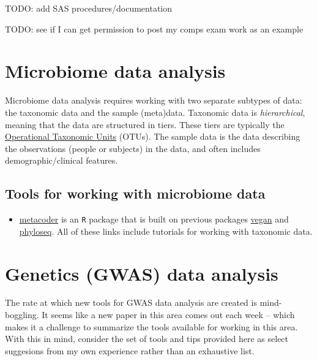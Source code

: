 \documentclass[
]{book}
\providecommand{\tightlist}{%
  \setlength{\itemsep}{0pt}\setlength{\parskip}{0pt}}
\begin{document}
TODO: add SAS procedures/documentation

TODO: see if I can get permission to post my comps exam work as an example

\hypertarget{microbiome-data-analysis}{%
\chapter{Microbiome data analysis}\label{microbiome-data-analysis}}

Microbiome data analysis requires working with two separate subtypes of data: the taxonomic data and the sample (meta)data. Taxonomic data is \emph{hierarchical}, meaning that the data are structured in tiers. These tiers are typically the \href{https://en.wikipedia.org/wiki/Operational_taxonomic_unit}{Operational Taxonomic Units} (OTUs). The sample data is the data describing the observations (people or subjects) in the data, and often includes demographic/clinical features.

\hypertarget{tools-for-working-with-microbiome-data}{%
\section{Tools for working with microbiome data}\label{tools-for-working-with-microbiome-data}}

\begin{itemize}
\tightlist
\item
  \href{https://grunwaldlab.github.io/metacoder_documentation/}{metacoder} is an \texttt{R} package that is built on previous packages \href{https://peat-clark.github.io/BIO381/veganTutorial.html}{vegan} and \href{https://vaulot.github.io/tutorials/Phyloseq_tutorial.html\#phyloseq-r-library}{phyloseq}. All of these links include tutorials for working with taxonomic data.
\end{itemize}

\hypertarget{genetics-gwas-data-analysis}{%
\chapter{Genetics (GWAS) data analysis}\label{genetics-gwas-data-analysis}}

The rate at which new tools for GWAS data analysis are created is mind-boggling. It seems like a new paper in this area comes out each week -- which makes it a challenge to summarize the tools available for working in this area. With this in mind, consider the set of tools and tips provided here as select suggesions from my own experience rather than an exhaustive list.
\end{document}
